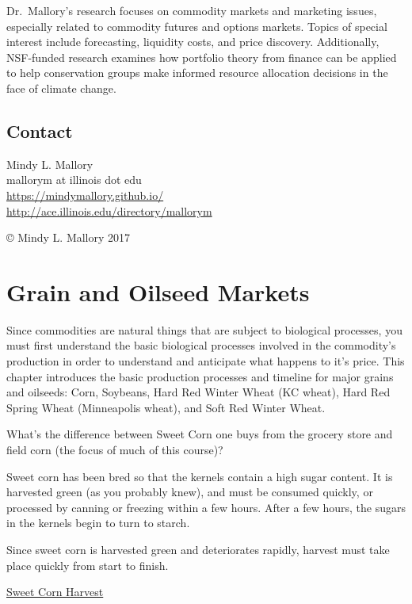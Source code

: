 \documentclass[]{book}
\theoremstyle{definition}
\theoremstyle{definition}
\theoremstyle{remark}
\begin{document}
Dr.~Mallory's research focuses on commodity markets and marketing
issues, especially related to commodity futures and options markets.
Topics of special interest include forecasting, liquidity costs, and
price discovery. Additionally, NSF-funded research examines how
portfolio theory from finance can be applied to help conservation groups
make informed resource allocation decisions in the face of climate
change.

\section*{Contact}\label{contact}

Mindy L. Mallory\\
mallorym at illinois dot edu\\
\url{https://mindymallory.github.io/}\\
\url{http://ace.illinois.edu/directory/mallorym}

© Mindy L. Mallory 2017

\chapter{Grain and Oilseed Markets}\label{grain-and-oilseed-markets}

Since commodities are natural things that are subject to biological
processes, you must first understand the basic biological processes
involved in the commodity's production in order to understand and
anticipate what happens to it's price. This chapter introduces the basic
production processes and timeline for major grains and oilseeds: Corn,
Soybeans, Hard Red Winter Wheat (KC wheat), Hard Red Spring Wheat
(Minneapolis wheat), and Soft Red Winter Wheat.

What's the difference between Sweet Corn one buys from the grocery store
and field corn (the focus of much of this course)?

Sweet corn has been bred so that the kernels contain a high sugar
content. It is harvested green (as you probably knew), and must be
consumed quickly, or processed by canning or freezing within a few
hours. After a few hours, the sugars in the kernels begin to turn to
starch.

Since sweet corn is harvested green and deteriorates rapidly, harvest
must take place quickly from start to finish.

\href{https://www.youtube.com/watch?v=4WEYDx82fG8}{Sweet Corn Harvest}
\end{document}
